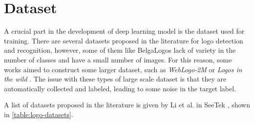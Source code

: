 \chapter{Dataset}
\label{chap:dataset}

A crucial part in the development of deep learning model is the dataset used for training. There are several datasets proposed in the literature for logo detection and recognition, however, some of them like BelgaLogos \cite{neumann2002integration} lack of variety in the number of classes and have a small number of images. For this reason, some works aimed to construct some larger dataset, such as \textit{WebLogo-2M} \cite{su2017weblogo} or \textit{Logos in the wild} \cite{tuzko2017open}. The issue with these types of large scale dataset is that they are automatically collected and labeled, leading to some noise in the target label.

A list of datasets proposed in the literature is given by Li et al. in SeeTek \cite{li2022seetek}, shown in \autoref{table:logo-datasets}.

